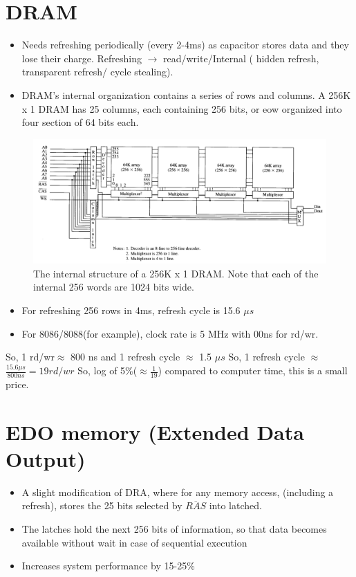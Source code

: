 \section{DRAM}
\begin{itemize}
  \item Needs refreshing periodically (every 2-4ms) as capacitor stores data and they lose their charge. Refreshing $\longrightarrow$ read/write/Internal ( hidden refresh, transparent refresh/ cycle stealing).
  \item DRAM's internal organization contains a series of rows and columns. A 256K x 1 DRAM has 25 columns, each containing 256 bits, or eow organized into four section of 64 bits each.

\end{itemize}
\begin{figure}[h!]
  \centering
  \includegraphics[width = 1.1\textwidth]{./figures/DRAM2.png}
  \caption{The internal structure of a 256K x 1 DRAM. Note that each of the internal 256 words are 1024 bits wide.}
  \label{}
\end{figure}
\begin{itemize}
  \item For refreshing 256 rows in 4ms, refresh cycle is 15.6 $\mu s$
  \item For 8086/8088(for example), clock rate is 5 MHz with 00ns for rd/wr.
\end{itemize}

So, 1 rd/wr$\approx$ 800 ns and 1 refresh cycle $\approx$ 1.5 $\mu s$ \newline
So, 1 refresh cycle $\approx$ $\frac{15.6 \mu s}{800 ns} = 19 rd/wr$ \newline
So, log of 5\%($\approx \frac{1}{19}$) compared to computer time, this is a small price.

\section{EDO memory (Extended  Data Output)}
\begin{itemize}
  \item A slight modification of DRA, where for any memory access, (including a refresh), stores the 25 bits selected by $\overline{RAS}$ into latched.
  \item The latches hold the next 256 bits of information, so that data becomes available without wait in case of sequential execution
  \item Increases system performance by 15-25\%
\end{itemize}

